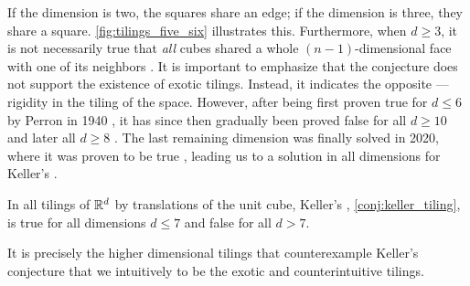 \documentclass[../thesis.tex]{subfiles}
\begin{document}
If the dimension is two, the squares share an edge; if the dimension is three, they share a square. \cref{fig:tilings_five_six} illustrates this. Furthermore, when $d\geq 3$, it is not necessarily true that \emph{all} cubes shared a whole $(n-1)$-dimensional face with one of its neighbors \cite{perronUeberLueckenloseAusfuellung1940}. It is important to emphasize that the conjecture does not support the existence of exotic tilings. Instead, it indicates the opposite — rigidity in the tiling of the space. %
However, after being first proven true for $d\leq 6$ by Perron in 1940 \cite{perronModulartigeLueckenloseAusfuellung1940,perronModulartigeLueckenloseAusfuellung1940a}, it has since then gradually been proved false for all $d\geq10$ \cite{lagariasKellerCubetilingConjecture1992} and later all $d\geq8$ \cite{mackeyCubeTilingDimension2002}. The last remaining dimension was finally solved in 2020, where it was proven to be true \cite{brakensiekResolutionKellerConjecture2020}, leading us to a solution in all dimensions for Keller's .%

\begin{theorem}
    In all tilings of $\mathbb{R}^d$ by translations of the unit cube, Keller's , \cref{conj:keller_tiling}, is true for all dimensions $d\leq 7$ and false for all $d>7$.
\end{theorem}
It is precisely the higher dimensional tilings that counterexample Keller's conjecture that we intuitively  to be the exotic and counterintuitive tilings.
\end{document}
